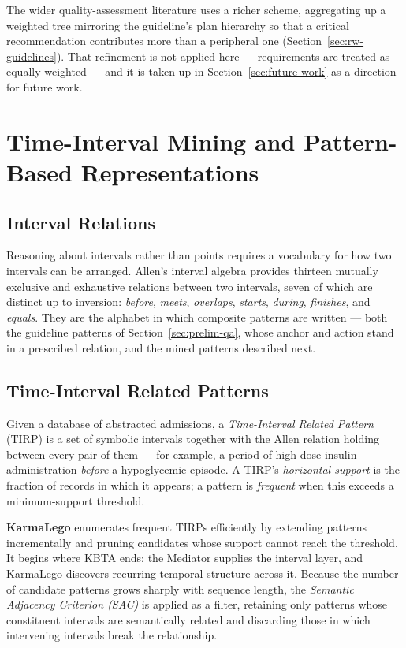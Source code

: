 The wider quality-assessment literature uses a richer scheme, aggregating up a weighted tree mirroring the guideline's plan hierarchy so that a critical recommendation contributes more than a peripheral one (Section~\ref{sec:rw-guidelines}). That refinement is not applied here --- requirements are treated as equally weighted --- and it is taken up in Section~\ref{sec:future-work} as a direction for future work.

\section{Time-Interval Mining and Pattern-Based Representations}
\label{sec:prelim-tirp}

\subsection{Interval Relations}

Reasoning about intervals rather than points requires a vocabulary for how two intervals can be arranged. Allen's interval algebra \citep{allen1983maintaining} provides thirteen mutually exclusive and exhaustive relations between two intervals, seven of which are distinct up to inversion: \emph{before}, \emph{meets}, \emph{overlaps}, \emph{starts}, \emph{during}, \emph{finishes}, and \emph{equals}. They are the alphabet in which composite patterns are written --- both the guideline patterns of Section~\ref{sec:prelim-qa}, whose anchor and action stand in a prescribed relation, and the mined patterns described next.

\subsection{Time-Interval Related Patterns}

Given a database of abstracted admissions, a \emph{Time-Interval Related Pattern} (TIRP) is a set of symbolic intervals together with the Allen relation holding between every pair of them --- for example, a period of high-dose insulin administration \emph{before} a hypoglycemic episode. A TIRP's \emph{horizontal support} is the fraction of records in which it appears; a pattern is \emph{frequent} when this exceeds a minimum-support threshold.

\textbf{KarmaLego} \citep{moskovitch2015karmalego} enumerates frequent TIRPs efficiently by extending patterns incrementally and pruning candidates whose support cannot reach the threshold. It begins where KBTA ends: the Mediator supplies the interval layer, and KarmaLego discovers recurring temporal structure across it. Because the number of candidate patterns grows sharply with sequence length, the \emph{Semantic Adjacency Criterion (SAC)} \citep{sac-time-intervals-mining} is applied as a filter, retaining only patterns whose constituent intervals are semantically related and discarding those in which intervening intervals break the relationship.

